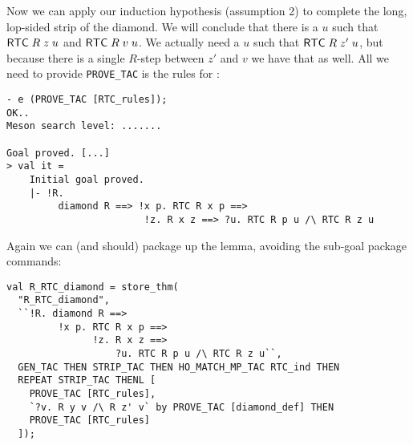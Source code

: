 Now we can apply our induction hypothesis (assumption 2) to complete
the long, lop-sided strip of the diamond.  We will conclude that there
is a $u$ such that ${\sf RTC}\;R\;z\;u$ and ${\sf RTC}\;R\;v\;u$.  We
actually need a $u$ such that ${\sf RTC}\;R\;z'\;u$, but because there
is a single $R$-step between $z'$ and $v$ we have that as well.  All
we need to provide \texttt{PROVE\_TAC} is the rules for :
\begin{session}
\begin{verbatim}
- e (PROVE_TAC [RTC_rules]);
OK..
Meson search level: .......

Goal proved. [...]
> val it =
    Initial goal proved.
    |- !R.
         diamond R ==> !x p. RTC R x p ==>
                        !z. R x z ==> ?u. RTC R p u /\ RTC R z u
\end{verbatim}
\end{session}
    Again we can (and should) package up the lemma, avoiding the
    sub-goal package commands:
\begin{session}
\begin{verbatim}
val R_RTC_diamond = store_thm(
  "R_RTC_diamond",
  ``!R. diamond R ==>
         !x p. RTC R x p ==>
               !z. R x z ==>
                   ?u. RTC R p u /\ RTC R z u``,
  GEN_TAC THEN STRIP_TAC THEN HO_MATCH_MP_TAC RTC_ind THEN
  REPEAT STRIP_TAC THENL [
    PROVE_TAC [RTC_rules],
    `?v. R y v /\ R z' v` by PROVE_TAC [diamond_def] THEN
    PROVE_TAC [RTC_rules]
  ]);
\end{verbatim}
\end{session}
\eos{}

